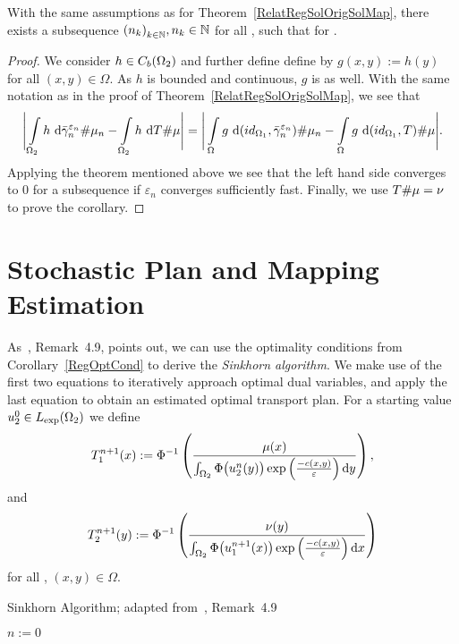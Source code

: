 
\begin{corollary}\label{RelatRegOrigCor}
	With the same assumptions as for Theorem~\ref{RelatRegSolOrigSolMap}, there exists a subsequence ${(n_k)}_{\NinN[k]}, \NinN[n_k]$ for all \NinN[k], such that  for \Ninf.
\end{corollary}

\begin{proof}
	We consider $h \in \CF[b]{\Omega_2}$ and further define define \map[g]{\Omega}{\R} by $g(x, y) := h(y)$ for all $(x, y) \in \Omega$. As $h$ is bounded and continuous, $g$ is as well. With the same notation as in the proof of Theorem~\ref{RelatRegSolOrigSolMap}, we see that
	\[ \Bigg\lvert \int\limits_{\Omega_2} h~\D[{\push[\bar{\gamma}_n^{\varepsilon_n}]{\mu_n}}] - \int\limits_{\Omega_2} h~\D[{\push{\mu}}] \Bigg\rvert = \Bigg\lvert \int\limits_{\Omega} g~\D[{\push[(id_{\Omega_1}, \bar{\gamma}_n^{\varepsilon_n})]{\mu_n}}] - \int\limits_{\Omega} g~\D[{\push[(id_{\Omega_1}, T)]{\mu}}] \Bigg\rvert. \]
	Applying the theorem mentioned above we see that the left hand side converges to $0$ for a subsequence if $\varepsilon_n$ converges sufficiently fast. Finally, we use $\push{\mu} = \nu$ to prove the corollary.
\end{proof}

\section{Stochastic Plan and Mapping Estimation}\label{StoPlanAndMapEst}

As~\cite{Cla2021}, Remark~4.9, points out, we can use the optimality conditions from Corollary~\ref{RegOptCond} to derive the \textit{Sinkhorn algorithm}. We make use of the first two equations to iteratively approach optimal dual variables, and apply the last equation to obtain an estimated optimal transport plan. For a starting value $u_2^0 \in \Lexp[\Omega_2]$ we define
\[ T_1^{n + 1}(x) := \Phi^{-1} \left( \frac{\mu(x)}{\int_{\Omega_2} \Phi\big( u_2^n(y) \big) \exp\left( \frac{-c(x, y)}{\varepsilon} \right)\D[y]} \right), \]
and
\[ T_2^{n + 1}(y) := \Phi^{-1} \left( \frac{\nu(y)}{\int_{\Omega_2} \Phi\big( u_1^{n + 1}(x) \big) \exp\left( \frac{-c(x, y)}{\varepsilon} \right)\D[x]} \right) \]
for all \NinN, $(x, y) \in \Omega$.
\begin{algorithm}\label{SinkhornAlg}
	\caption{Sinkhorn Algorithm; adapted from~\cite{Cla2021}, Remark~4.9}
	$n := 0$\;
\end{algorithm}

